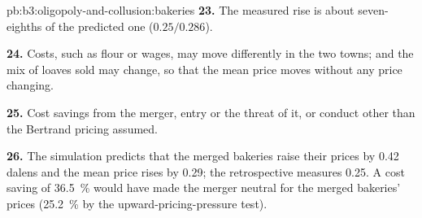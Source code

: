 \begin{solution}{pb:b3:oligopoly-and-collusion:bakeries}
\textbf{23.} The measured rise is about seven-eighths of the predicted one ($0.25/0.286$).

\textbf{24.} Costs, such as flour or wages, may move differently in the two towns; and
the mix of loaves sold may change, so that the mean price moves without any price
changing.

\textbf{25.} Cost savings from the merger, entry or the threat of it, or conduct other
than the Bertrand pricing assumed.

\textbf{26.} The simulation predicts that the merged bakeries raise their prices by 0.42
dalens and the mean price rises by 0.29; the retrospective measures 0.25. A cost saving of 36.5~\% would
have made the merger neutral for the merged bakeries' prices (25.2~\% by the upward-pricing-pressure test).
\end{solution}
